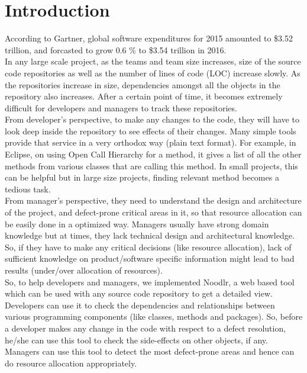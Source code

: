 
\section{Introduction}
\label{sec:intro}
According to Gartner, global software expenditures for 2015 amounted to \$3.52 trillion, and forcasted to grow 0.6 \% to \$3.54 trillion in 2016\cite{gartner2016}.\\

In any large scale project, as the teams and team size increases, size of the source code repositories as well as the number of lines of code (LOC) increase slowly. As the repositories increase in size, dependencies amongst all the objects in the repository also increases. After a certain point of time, it becomes extremely difficult for developers and managers to track these repositories. \\

From developer's perspective, to make any changes to the code, they will have to look deep inside the repository to see effects of their changes. Many simple tools provide that service in a very orthodox way (plain text format). For example, in Eclipse, on using Open Call Hierarchy for a method, it gives a list of all the other methods from various classes that are calling this method. In small projects, this can be helpful but in large size projects, finding relevant method becomes a tedious task. \\

From manager's perspective, they need to understand the design and architecture of the project, and defect-prone critical areas in it, so that resource allocation can be easily done in a optimized way. Managers usually have strong domain knowledge but at times, they lack technical design and architectural knowledge. So, if they have to make any critical decisions (like resource allocation), lack of sufficient knowledge on product/software specific information might lead to bad results (under/over allocation of resources).\\

So, to help developers and managers, we implemented Noodlr, a web based tool which can be used with any source code repository to get a detailed view. Developers can use it to check the dependencies and relationships between various programming components (like classes, methods and packages). So, before a developer makes any change in the code with respect to a defect resolution, he/she can use this tool to check the side-effects on other objects, if any. Managers can use this tool to detect the most defect-prone areas and hence can do resource allocation appropriately. \\

